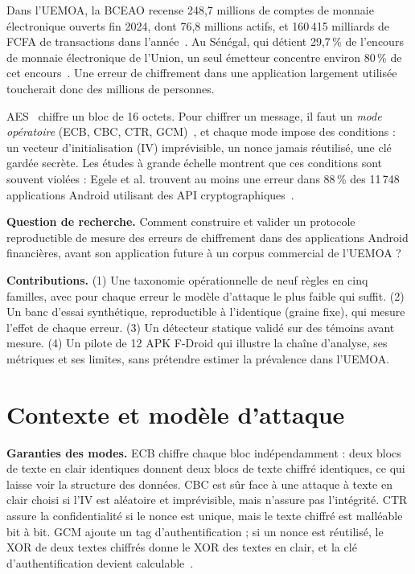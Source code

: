 \documentclass[conference,a4paper]{IEEEtran}
\begin{document}
Dans l'UEMOA, la BCEAO recense 248,7 millions de comptes de monnaie électronique ouverts fin 2024, dont 76,8 millions actifs, et 160\,415 milliards de FCFA de transactions dans l'année~\cite{bceao2024}. Au Sénégal, qui détient 29,7\,\% de l'encours de monnaie électronique de l'Union, un seul émetteur concentre environ 80\,\% de cet encours~\cite{cbumoa2025}. Une erreur de chiffrement dans une application largement utilisée toucherait donc des millions de personnes.

AES~\cite{fips197} chiffre un bloc de 16 octets. Pour chiffrer un message, il faut un \emph{mode opératoire} (ECB, CBC, CTR, GCM)~\cite{nist38a,nist38d}, et chaque mode impose des conditions : un vecteur d'initialisation (IV) imprévisible, un nonce jamais réutilisé, une clé gardée secrète. Les études à grande échelle montrent que ces conditions sont souvent violées : Egele et al. trouvent au moins une erreur dans 88\,\% des 11\,748 applications Android utilisant des API cryptographiques~\cite{egele2013}.

\textbf{Question de recherche.} Comment construire et valider un protocole reproductible de mesure des erreurs de chiffrement dans des applications Android financières, avant son application future à un corpus commercial de l'UEMOA ?

\textbf{Contributions.} (1) Une taxonomie opérationnelle de neuf règles en cinq familles, avec pour chaque erreur le modèle d'attaque le plus faible qui suffit. (2) Un banc d'essai synthétique, reproductible à l'identique (graine fixe), qui mesure l'effet de chaque erreur. (3) Un détecteur statique validé sur des témoins avant mesure. (4) Un pilote de 12 APK F-Droid qui illustre la chaîne d'analyse, ses métriques et ses limites, sans prétendre estimer la prévalence dans l'UEMOA.

\section{Contexte et modèle d'attaque}

\textbf{Garanties des modes.} ECB chiffre chaque bloc indépendamment : deux blocs de texte en clair identiques donnent deux blocs de texte chiffré identiques, ce qui laisse voir la structure des données. CBC est sûr face à une attaque à texte en clair choisi si l'IV est aléatoire et imprévisible, mais n'assure pas l'intégrité. CTR assure la confidentialité si le nonce est unique, mais le texte chiffré est malléable bit à bit. GCM ajoute un tag d'authentification ; si un nonce est réutilisé, le XOR de deux textes chiffrés donne le XOR des textes en clair, et la clé d'authentification devient calculable~\cite{joux2006}.
\end{document}
